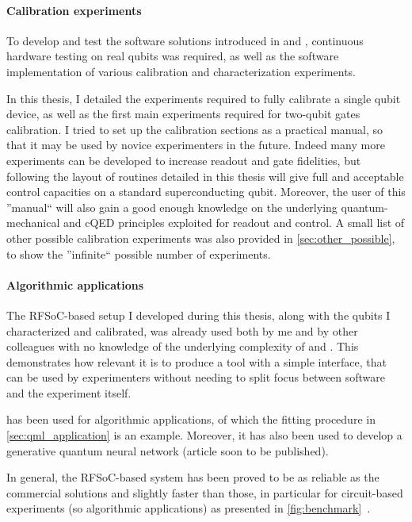 \paragraph{Calibration experiments}

To develop and test the software solutions introduced in \Qibolab and \Qibosoq, continuous hardware testing on real qubits was required, as well as the software implementation of various calibration and characterization experiments.

In this thesis, I detailed the experiments required to fully calibrate a single qubit device, as well as the first main experiments required for two-qubit gates calibration. 
I tried to set up the calibration sections as a practical manual, so that it may be used by novice experimenters in the future.
Indeed many more experiments can be developed to increase readout and gate fidelities, but following the layout of routines detailed in this thesis will give full and acceptable control capacities on a standard superconducting qubit.
Moreover, the user of this ''manual`` will also gain a good enough knowledge on the underlying quantum-mechanical and cQED principles exploited for readout and control.
A small list of other possible calibration experiments was also provided in \cref{sec:other_possible}, to show the ''infinite`` possible number of experiments.

\paragraph{Algorithmic applications}

The RFSoC-based setup I developed during this thesis, along with the qubits I characterized and calibrated, was already used both by me and by other colleagues with no knowledge of the underlying complexity of \Qibosoq and \Qick. 
This demonstrates how relevant it is to produce a tool with a simple interface, that can be used by experimenters without needing to split focus between software and the experiment itself.

\Qibosoq has been used for algorithmic applications, of which the fitting procedure in \cref{sec:qml_application} is an example.
Moreover, it has also been used to develop a generative quantum neural network (article soon to be published).

In general, the RFSoC-based system has been proved to be as reliable as the commercial solutions and slightly faster than those, in particular for circuit-based experiments (so algorithmic applications) as presented in \cref{fig:benchmark}~\cite{qibosoq_paper, Efthymiou_2023}.

